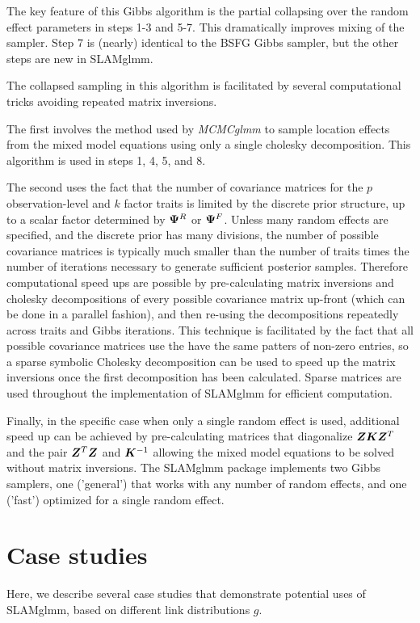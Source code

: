 \documentclass[11pt]{amsart}
\newcommand*{\B}[1]{\ifmmode\bm{#1}\else\textbf{#1}\fi}
\begin{document}
The key feature of this Gibbs algorithm is the partial collapsing over the random effect parameters in steps 1-3 and 5-7. This dramatically improves mixing of the sampler. Step 7 is (nearly) identical to the BSFG Gibbs sampler, but the other steps are new in SLAMglmm.

The collapsed sampling in this algorithm is facilitated by several computational tricks avoiding repeated matrix inversions. 

The first involves the method used by \emph{MCMCglmm} to sample location effects from the mixed model equations using only a single cholesky decomposition. This algorithm is used in steps 1, 4, 5, and 8.

The second uses the fact that the number of covariance matrices for the $p$ observation-level and $k$ factor traits is limited by the discrete prior structure, up to a scalar factor determined by $\B{\Psi}^R$ or $\B{\Psi}^F$. Unless many random effects are specified, and the discrete prior has many divisions, the number of possible covariance matrices is typically much smaller than the  number of traits times the number of iterations necessary to generate sufficient posterior samples. Therefore computational speed ups are possible by pre-calculating matrix inversions and cholesky decompositions of every possible covariance matrix up-front (which can be done in a parallel fashion), and then re-using the decompositions repeatedly across traits and Gibbs iterations.
This technique is facilitated by the fact that all possible covariance matrices use the have the same patters of non-zero entries, so a sparse symbolic Cholesky decomposition can be used to speed up the matrix inversions once the first decomposition has been calculated. Sparse matrices are used throughout the implementation of SLAMglmm for efficient computation.

Finally, in the specific case when only a single random effect is used, additional speed up can be achieved by pre-calculating matrices that diagonalize $\B{ZKZ}^T$ and the pair $\B{Z}^T\B{Z}$ and $\B{K}^{-1}$ allowing the mixed model equations to be solved without matrix inversions. The SLAMglmm package implements two Gibbs samplers, one ('general') that works with any number of random effects, and one ('fast') optimized for a single random effect.

\section{Case studies}
\label{link_functions}
Here, we describe several case studies that demonstrate potential uses of SLAMglmm, based on different link distributions $g$.
\end{document}
